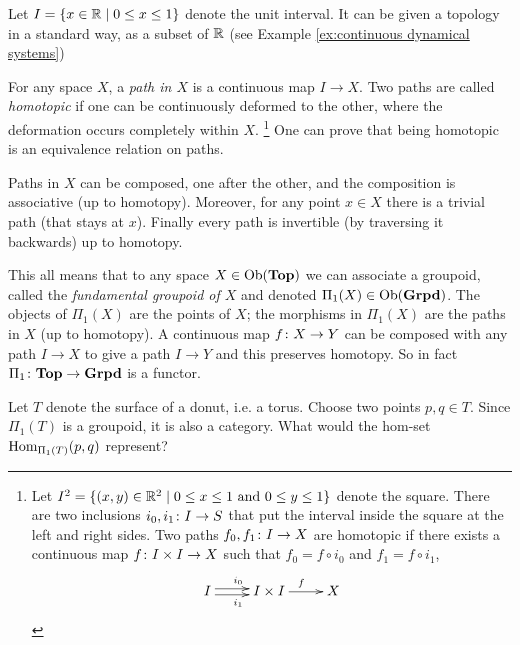 \begin{example}\label{ex:fundamental groupoid}

Let $I=\{x\in{\mathbb R}{\;|\;}0\leq x\leq 1\}$ denote the unit interval. It can be given a topology in a standard way, as a subset of ${\mathbb R}$ (see Example \ref{ex:continuous dynamical systems})

For any space $X$, a {\em path in $X$} is a continuous map $I\to X$. Two paths are called {\em homotopic} if one can be continuously deformed to the other, where the deformation occurs completely within $X$.
\footnote{
Let $I^2=\{(x,y)\in{\mathbb R}^2{\;|\;}0\leq x\leq 1 \textnormal{ and } 0\leq y\leq 1\}$ denote the square. There are two inclusions $i_0,i_1\colon I\rightarrow S$ that put the interval inside the square at the left and right sides. Two paths $f_0,f_1\colon I\rightarrow X$ are homotopic if there exists a continuous map $f\colon I\times I\rightarrow X$ such that $f_0=f\circ i_0$ and $f_1=f\circ i_1$, 
$$\xymatrix{I\ar@<-.5ex>[r]_{i_1}\ar@<.5ex>[r]^{i_0}&I\times I\ar[r]^f&X}$$
} 
One can prove that being homotopic is an equivalence relation on paths. 

Paths in $X$ can be composed, one after the other, and the composition is associative (up to homotopy). Moreover, for any point $x\in X$ there is a trivial path (that stays at $x$). Finally every path is invertible (by traversing it backwards) up to homotopy. 

This all means that to any space $X\in\textnormal{Ob}({\bf Top})$ we can associate a groupoid, called the {\em fundamental groupoid of $X$} and denoted $\Pi_1(X)\in\textnormal{Ob}({\bf Grpd})$. The objects of $\Pi_1(X)$ are the points of $X$; the morphisms in $\Pi_1(X)$ are the paths in $X$ (up to homotopy). A continuous map $f\colon X\rightarrow Y$ can be composed with any path $I\to X$ to give a path $I\to Y$ and this preserves homotopy. So in fact $\Pi_1\colon{\bf Top}\rightarrow{\bf Grpd}$ is a functor.

\end{example}

\begin{exercise}
Let $T$ denote the surface of a donut, i.e. a torus. Choose two points $p,q\in T$. Since $\Pi_1(T)$ is a groupoid, it is also a category. What would the hom-set $\textnormal{Hom}_{\Pi_1(T)}(p,q)$ represent?
\end{exercise}

